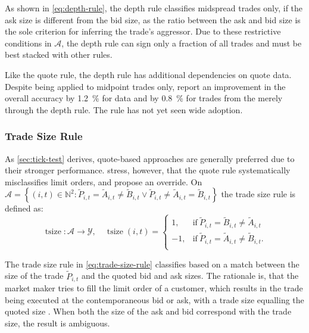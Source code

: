 As shown in \cref{eq:depth-rule}, the depth rule classifies midspread trades only, if the ask size is different from the bid size, as the ratio between the ask and bid size is the sole criterion for inferring the trade's aggressor. Due to these restrictive conditions in $\mathcal{A}$, the depth rule can sign only a fraction of all trades and must be best stacked with other rules.

Like the quote rule, the depth rule has additional dependencies on quote data. Despite being applied to midpoint trades only, \textcite[][4]{grauerOptionTradeClassification2022} report an improvement in the overall accuracy by \SI{1.2}{\percent} for  data and by \SI{0.8}{\percent} for trades from the  merely through the depth rule. The rule has not yet seen wide adoption.

\subsubsection{Trade Size Rule}\label{sec:trade-size-rule}

As \cref{sec:tick-test} derives, quote-based approaches are generally preferred due to their stronger performance. \textcite[][13]{grauerOptionTradeClassification2022} stress, however, that the quote rule systematically misclassifies limit orders, and propose an override. On $\mathcal{A} = \left\{(i, t) \in \mathbb{N}^2: \tilde{P}_{i,t} = \tilde{A}_{i,t} \neq \tilde{B}_{i,t} \lor \tilde{P}_{i,t} \neq\tilde{A}_{i,t} = \tilde{B}_{i,t} \right\}$ the trade size rule is defined as:
\begin{equation}
    \operatorname{tsize} \colon \mathcal{A} \to \mathcal{Y},\quad
    \operatorname{tsize}(i, t)=
    \begin{cases}
        1,  & \text{if}\ \tilde{P}_{i, t} = \tilde{B}_{i, t} \neq \tilde{A}_{i, t}  \\
        -1, & \text{if}\ \tilde{P}_{i, t} = \tilde{A}_{i, t} \neq \tilde{B}_{i, t}. \\
    \end{cases}
    \label{eq:trade-size-rule}
\end{equation}

The trade size rule in \cref{eq:trade-size-rule} classifies based on a match between the size of the trade $\tilde{P}_{i, t}$ and the quoted bid and ask sizes. The rationale is, that the market maker tries to fill the limit order of a customer, which results in the trade being executed at the contemporaneous bid or ask, with a trade size equalling the quoted size \autocite[][13]{grauerOptionTradeClassification2022}. When both the size of the ask and bid correspond with the trade size, the result is ambiguous.

